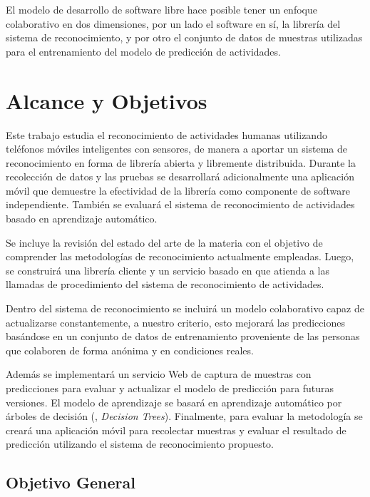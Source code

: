 El modelo de desarrollo de software libre hace posible tener un enfoque
colaborativo en dos dimensiones, por un lado el software en sí, la
librería del sistema de reconocimiento, y por otro el conjunto de
datos de muestras utilizadas para el entrenamiento del modelo de predicción
de actividades.

\section{Alcance y Objetivos}

\label{sec13:alcance-y-objetivos}

Este trabajo estudia el reconocimiento de actividades humanas utilizando
teléfonos móviles inteligentes con sensores, de manera a aportar un
sistema de reconocimiento en forma de librería abierta y libremente
distribuida. Durante la recolección de datos y las pruebas se desarrollará
adicionalmente una aplicación móvil que demuestre la efectividad de
la librería como componente de software independiente. También se
evaluará el sistema de reconocimiento de actividades basado en aprendizaje
automático.

Se incluye la revisión del estado del arte de la materia con el objetivo
de comprender las metodologías de reconocimiento actualmente empleadas.
Luego, se construirá una librería cliente y un servicio basado en
\emph{} que atienda a las llamadas de procedimiento
del sistema de reconocimiento de actividades. 

Dentro del sistema de reconocimiento se incluirá un modelo colaborativo
capaz de actualizarse constantemente, a nuestro criterio, esto mejorará
las predicciones basándose en un conjunto de datos de entrenamiento
proveniente de las personas que colaboren de forma anónima y en condiciones
reales.

Además se implementará un servicio Web de captura de muestras con
predicciones para evaluar y actualizar el modelo de predicción para
futuras versiones. El modelo de aprendizaje se basará en aprendizaje
automático por árboles de decisión (, \emph{Decision Trees}).
Finalmente, para evaluar la metodología se creará una aplicación móvil
para recolectar muestras y evaluar el resultado de predicción utilizando
el sistema de reconocimiento propuesto.

\subsection{Objetivo General}

